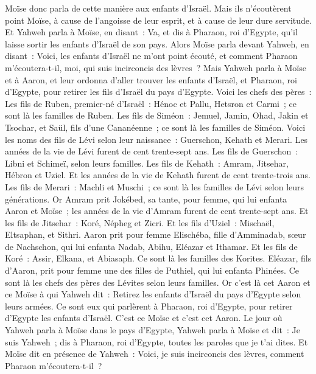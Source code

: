 \begin{multicols}{2}
Moïse donc parla de cette manière aux enfants d'Israël. Mais ils n'écoutèrent point Moïse, à cause de l'angoisse de leur esprit, et à cause de leur dure servitude.
Et Yahweh parla à Moïse, en disant~:
Va, et dis à Pharaon, roi d'Egypte, qu'il laisse sortir les enfants d'Israël de son pays.
Alors Moïse parla devant Yahweh, en disant~: Voici, les enfants d'Israël ne m'ont point écouté, et comment Pharaon m'écoutera-t-il, moi, qui suis incirconcis des lèvres~?
 Mais Yahweh parla à Moïse et à Aaron, et leur ordonna d'aller trouver les enfants d'Israël, et Pharaon, roi d'Egypte, pour retirer les fils d'Israël du pays d'Egypte.
Voici les chefs des pères~: Les fils de Ruben, premier-né d'Israël~: Hénoc et Pallu, Hetsron et Carmi~; ce sont là les familles de Ruben.
Les fils de Siméon~: Jemuel, Jamin, Ohad, Jakin et Tsochar, et Saül, fils d'une Cananéenne~; ce sont là les familles de Siméon.
Voici les noms des fils de Lévi selon leur naissance~: Guerschon, Kehath et Merari. Les années de la vie de Lévi furent de cent trente-sept ans.
Les fils de Guerschon~: Libni et Schimeï, selon leurs familles.
Les fils de Kehath~: Amram, Jitsehar, Hébron et Uziel. Et les années de la vie de Kehath furent de cent trente-trois ans.
Les fils de Merari~: Machli et Muschi~; ce sont là les familles de Lévi selon leurs générations.
Or Amram prit Jokébed, sa tante, pour femme, qui lui enfanta Aaron et Moïse~; les années de la vie d'Amram furent de cent trente-sept ans.
Et les fils de Jitsehar~: Koré, Népheg et Zicri.
Et les fils d'Uziel~: Mischaël, Eltsaphan, et Sithri.
Aaron prit pour femme Elischéba, fille d'Amminadab, sœur de Nachschon, qui lui enfanta Nadab, Abihu, Eléazar et Ithamar.
Et les fils de Koré~: Assir, Elkana, et Abiasaph. Ce sont là les familles des Korites.
Eléazar, fils d'Aaron, prit pour femme une des filles de Puthiel, qui lui enfanta Phinées. Ce sont là les chefs des pères des Lévites selon leurs familles.
Or c'est là cet Aaron et ce Moïse à qui Yahweh dit~: Retirez les enfants d'Israël du pays d'Egypte selon leurs armées.
Ce sont eux qui parlèrent à Pharaon, roi d'Egypte, pour retirer d'Egypte les enfants d'Israël. C'est ce Moïse et c'est cet Aaron.
Le jour où Yahweh parla à Moïse dans le pays d'Egypte,
Yahweh parla à Moïse et dit~: Je suis Yahweh~; dis à Pharaon, roi d'Egypte, toutes les paroles que je t'ai dites.
Et Moïse dit en présence de Yahweh~: Voici, je suis incirconcis des lèvres, comment Pharaon m'écoutera-t-il~?

\end{multicols}
